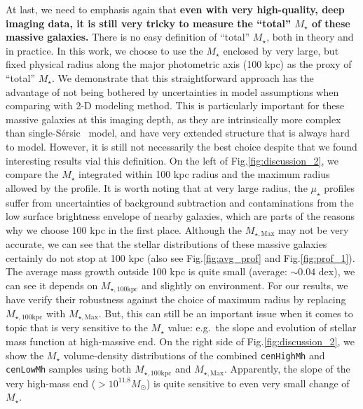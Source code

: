\documentclass{emulateapj}
\def\ser{{S\'{e}rsic\ }}
\def\rbcg{\texttt{cenHighMh}}
\def\nbcg{\texttt{cenLowMh}}
\def\mstar{{$M_{\star}$}}
\def\mtot{{$M_{\star,100\mathrm{kpc}}$}}
\def\mmax{{$M_{\star,\mathrm{Max}}$}}
\def\mden{{$\mu_{\star}$}}
\newcommand{\update}[1]{\textcolor{Bittersweet}{#1}}
\begin{document}
\begin{CJK*}{UTF8}{gbsn}
    \update{
    At last, we need to emphasis again that \textbf{even with very high-quality, 
    deep imaging data, it is still very tricky to measure the ``total'' \mstar{} of 
    these massive galaxies.}
    There is no easy definition of ``total'' \mstar{}, both in theory and in practice. 
    In this work, we choose to use the \mstar{} enclosed by very large, but fixed 
    physical radius along the major photometric axis (100 kpc) as the proxy of 
    ``total'' \mstar{}.
    We demonstrate that this straightforward approach has the advantage of not 
    being bothered by uncertainties in model assumptions when comparing with 2-D 
    modeling method. 
    This is particularly important for these massive galaxies at this imaging depth,
    as they are intrinsically more complex than single-\ser{} model, and have very 
    extended structure that is always hard to model. 
    However, it is still not necessarily the best choice despite that we found 
    interesting results vial this definition.
    On the left of Fig.\ref{fig:discussion_2}, we compare the \mstar{} integrated within 
    100 kpc radius and the maximum radius allowed by the profile. 
    It is worth noting that at very large radius, the \mden{} profiles suffer from 
    uncertainties of background subtraction and contaminations from the low
    surface brightness envelope of nearby galaxies, which are parts of the reasons 
    why we choose 100 kpc in the first place. 
    Although the \mmax{} may not be very accurate, we can see that the stellar 
    distributions of these massive galaxies certainly do not stop at 100 kpc 
    (also see Fig.\ref{fig:avg_prof} and Fig.\ref{fig:prof_1}). 
    The average mass growth outside 100 kpc is quite small (average: $\sim 0.04$ dex),
    we can see it depends on \mtot{} and slightly on environment. 
    For our results, we have verify their robustness against the choice of maximum 
    radius by replacing \mtot{} with \mmax{}. 
    But, this can still be an important issue when it comes to topic that is very 
    sensitive to the \mstar{} value: e.g.~the slope and evolution of stellar mass 
    function at high-massive end. 
    On the right side of Fig.\ref{fig:discussion_2}, we show the \mstar{} 
    volume-density distributions of the combined \rbcg{} and \nbcg{} samples using 
    both \mtot{} and \mmax{}.  
    Apparently, the slope of the very high-mass end ($> 10^{11.8} M_{\odot}$) is quite 
    sensitive to even very small change of \mstar{}.
    }
    

\end{CJK*}
\end{document}
